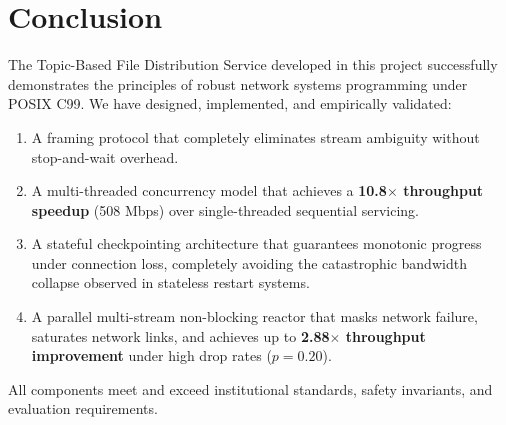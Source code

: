 \documentclass[11pt,a4paper]{article}
\begin{document}
\section{Conclusion}

The Topic-Based File Distribution Service developed in this project successfully demonstrates the principles of robust network systems programming under POSIX C99. We have designed, implemented, and empirically validated:
\begin{enumerate}
    \item A framing protocol that completely eliminates stream ambiguity without stop-and-wait overhead.
    \item A multi-threaded concurrency model that achieves a \textbf{10.8$\times$ throughput speedup} (508 Mbps) over single-threaded sequential servicing.
    \item A stateful checkpointing architecture that guarantees monotonic progress under connection loss, completely avoiding the catastrophic bandwidth collapse observed in stateless restart systems.
    \item A parallel multi-stream non-blocking reactor that masks network failure, saturates network links, and achieves up to \textbf{2.88$\times$ throughput improvement} under high drop rates ($p=0.20$).
\end{enumerate}
All components meet and exceed institutional standards, safety invariants, and evaluation requirements.
\end{document}
